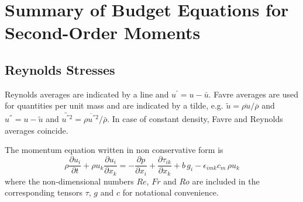 \section{Summary of Budget Equations for Second-Order Moments}

\subsection{Reynolds Stresses}

Reynolds averages are indicated by a line and $u^{'}=u-\bar{u}$.  Favre averages
are used for quantities per unit mass and are indicated by a tilde,
e.g. $\tilde{u}=\overline{\rho u}/\overline{\rho}$ and $u^{''}=u-\tilde{u}$ and
$\widetilde{u^{''2}}=\overline{\rho u^{''2}}/\bar{\rho}$. In case of constant
density, Favre and Reynolds averages coincide.

The momentum equation written in non conservative form is
\begin{equation}
\rho \frac{\partial u_i}{\partial t} + \rho u_k \frac{\partial u_i}{\partial
  x_k} = -\frac{\partial p}{\partial x_i} + \frac{\partial \tau_{ik}}{\partial
  x_k} + b\,g_i - \epsilon_{imk} c_m\,\rho u_k
\end{equation}
where the non-dimensional numbers $Re$, $Fr$ and $Ro$ are included in the
corresponding tensors $\tau$, $g$ and $c$ for notational convenience.

